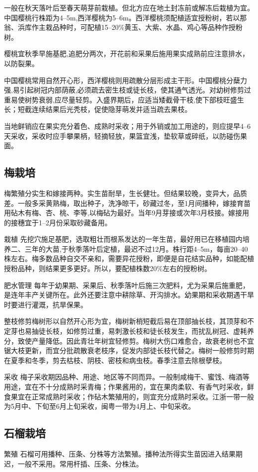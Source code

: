 \documentclass{ctexbook}
\begin{document}
一般在秋天落叶后至春天萌芽前栽植。但北方应在地土封冻前或解冻后栽植为宜。中国樱桃行株距为4--5m,西洋樱桃为5--6m。西洋樱桃须配植适宜授粉树，若以那翁、浜库作主栽品种时，可配植15--20\%黄玉、大紫、水晶、鸡心等品种作授粉树。

樱桃宜秋季早施基肥,追肥分两次，开花前和采果后施用果实成熟前应注意排水，以防裂果。

中国樱桃常用自然开心形，西洋樱桃则用疏散分层形成主干形。中国樱桃分蘖力强,易引起树冠内部荫蔽,必须疏去密生枝或徒长枝，使其通气透光。对幼树修剪过重易使树势衰弱,应尽量轻剪。入盛界期后，应适当矮截骨干枝,使下部枝旺盛生长；短截连续结果后光秃枝，促使隐芽萌发并适当疏去果枝。

当地鲜销应在果实充分着色、成熟时采收；用于外销或加工用途的，则应提早4--6天采收，采收时应手攀果柄，轻摘轻放，果篮宜浅，垫软草或碎纸，以防碰伤果面。
\subsection{梅栽培}
梅繁殖分实生和嫁接两种。实生苗耐旱，生长健壮。但结果较晚，变异大，品质差。一般多采黄熟梅，取出种子，洗净晾干，砂藏过冬，至1月间播种，嫁接育苗用砧木有梅、杏、桃、李等,以梅砧为最好。当年9月芽接或次年3月枝接。嫁接用的接穗宜于1--2月份采取砂藏备用。

栽植 先挖穴施足基肥，选取粗壮而根系发达的一年生苗，最好用已在移植园内培养二、三年的大苗,于秋季落叶后定植，最迟不过12月。株行距4--5m，每亩20--40株左右。梅多数品种自交不亲和，需要异花授粉，即便是自花结实品种，如能配植授粉品种，则结果更多更好。所以，要配植株数20\%左右的授粉树。

肥水管理 每年于幼果期、采果后、秋季落叶后施三次肥料，尤为采果后施重肥，是连年丰产关键所在。此外还要注意中耕除草、开沟排水。幼果期和采收期遇干旱时要进行灌溉，抗旱保果。

整枝修剪梅树形以自然开心形为宜，梅树新梢短截后易在顶部抽长枝，其顶芽和不定芽也易抽徒长枝，如修剪过重，易刺激长枝和徒长枝发生，而扰乱树冠、虚耗养分，致使产量降低。因此青壮年树宜轻修剪。梅树大伤口难愈合，故衰老树也不宜锯大枝更新，而宜分批疏散衰老枝序，促发内部徒长枝代替之。梅树一般修剪时期在夏季和冬季，剪去枯枝、阴枝、密枝和病虫枝。春季注意去除根孽枝。

采收 梅子采收期因品种、用途、地区等不同而异。一般制咸梅干、蜜饯、梅酒等用途，宜在不十分成熟时采青梅；作果酱用的，宜在果肉柔软、有香气时采收，鲜食果宜在正常成熟时采收；作砧木繁殖用的，则宜充分成熟时采收。江浙一带一般为5月中、下旬至6月上旬采收，闽粤一带为4月上、中旬采收。
\subsection{石榴栽培}
繁殖 石榴可用播种、压条、分株等方法繁殖。播种法所得实生苗因进入结果期迟，一般不采用。常用杆插、压条、分株法。
\end{document}

